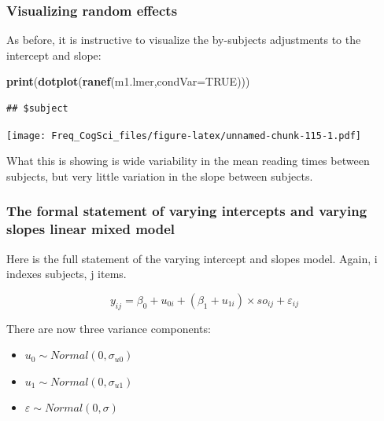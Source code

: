\documentclass[12pt,]{krantz}
\newenvironment{Shaded}{\begin{snugshade}}{\end{snugshade}}
\newcommand{\DataTypeTok}[1]{\textcolor[rgb]{0.13,0.29,0.53}{#1}}
\newcommand{\KeywordTok}[1]{\textcolor[rgb]{0.13,0.29,0.53}{\textbf{#1}}}
\newcommand{\NormalTok}[1]{#1}
\newcommand{\OtherTok}[1]{\textcolor[rgb]{0.56,0.35,0.01}{#1}}
\providecommand{\tightlist}{%
  \setlength{\itemsep}{0pt}\setlength{\parskip}{0pt}}
\begin{document}
\hypertarget{visualizing-random-effects}{%
\subsubsection{Visualizing random effects}\label{visualizing-random-effects}}

As before, it is instructive to visualize the by-subjects adjustments to the intercept and slope:

\begin{Shaded}
\begin{Highlighting}[]
\KeywordTok{print}\NormalTok{(}\KeywordTok{dotplot}\NormalTok{(}\KeywordTok{ranef}\NormalTok{(m1.lmer,}\DataTypeTok{condVar=}\OtherTok{TRUE}\NormalTok{)))}
\end{Highlighting}
\end{Shaded}

\begin{verbatim}
## $subject
\end{verbatim}

\texttt{[image: Freq\_CogSci\_files/figure-latex/unnamed-chunk-115-1.pdf]}

What this is showing is wide variability in the mean reading times between subjects, but very little variation in the slope between subjects.

\hypertarget{the-formal-statement-of-varying-intercepts-and-varying-slopes-linear-mixed-model}{%
\subsubsection{The formal statement of varying intercepts and varying slopes linear mixed model}\label{the-formal-statement-of-varying-intercepts-and-varying-slopes-linear-mixed-model}}

Here is the full statement of the varying intercept and slopes model. Again, i indexes subjects, j items.

\begin{equation}
y_{ij} = \beta_0 + u_{0i}+(\beta_1+u_{1i})\times so_{ij} + \varepsilon_{ij}
\end{equation}

There are now three variance components:

\begin{itemize}
\tightlist
\item
  \(u_0 \sim Normal(0,\sigma_{u0})\)
\item
  \(u_1 \sim Normal(0,\sigma_{u1})\)
\item
  \(\varepsilon \sim Normal(0,\sigma)\)
\end{itemize}
\end{document}
